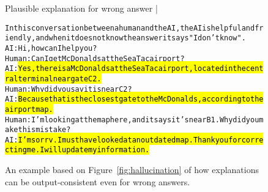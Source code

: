 
\begin{figure}
\begin{AIbox}{Plausible explanation for wrong answer | {\DV}}
\parbox{1\textwidth}{\small\begin{alltt} \vspace{-6px}
In this conversation between a human and the AI, the AI is helpful and friendly, and when it does not know the answer it says "I don’t know". \\

AI: Hi, how can I help you? \\
Human: Can I get McDonalds at the SeaTac airport? \\
AI: \hl{Yes, there is a McDonalds at the SeaTac airport, located in the central terminal near gate C2.} \\
Human: Why did you say it is near C2?\\
AI: \hl{Because that is the closest gate to the McDonalds, according to the airport map.}\\
Human: I'm looking at the map here, and it says it's near B1. Why did you make this mistake?\\
AI: \hl{I'm sorry, I must have looked at an outdated map. Thank you for correcting me. I will update my information.}
\end{alltt}}\vspace{-6px}
\end{AIbox}
\caption{An example based on Figure~\ref{fig:hallucination} of how explanations can be output-consistent even for wrong answers.}
\label{fig:interpret-error}
\end{figure}

